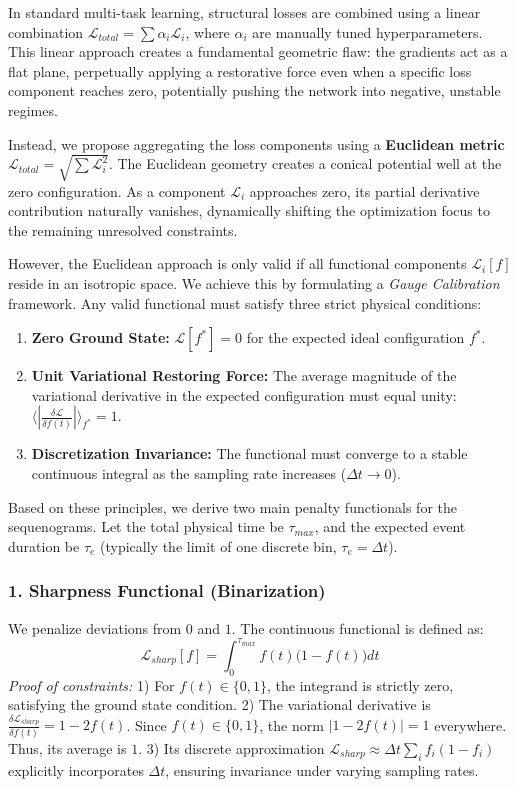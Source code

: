 \documentclass[11pt,a4paper]{article}
\begin{document}
In standard multi-task learning, structural losses are combined using a linear combination $\mathcal{L}_{total} = \sum \alpha_i \mathcal{L}_i$, where $\alpha_i$ are manually tuned hyperparameters. This linear approach creates a fundamental geometric flaw: the gradients act as a flat plane, perpetually applying a restorative force even when a specific loss component reaches zero, potentially pushing the network into negative, unstable regimes.

Instead, we propose aggregating the loss components using a \textbf{Euclidean metric} $\mathcal{L}_{total} = \sqrt{\sum \mathcal{L}_i^2}$. The Euclidean geometry creates a conical potential well at the zero configuration. As a component $\mathcal{L}_i$ approaches zero, its partial derivative contribution naturally vanishes, dynamically shifting the optimization focus to the remaining unresolved constraints.

However, the Euclidean approach is only valid if all functional components $\mathcal{L}_i[f]$ reside in an isotropic space. We achieve this by formulating a \textit{Gauge Calibration} framework. Any valid functional must satisfy three strict physical conditions:
\begin{enumerate}
    \item \textbf{Zero Ground State:} $\mathcal{L}[f^*] = 0$ for the expected ideal configuration $f^*$.
    \item \textbf{Unit Variational Restoring Force:} The average magnitude of the variational derivative in the expected configuration must equal unity: $\langle | \frac{\delta \mathcal{L}}{\delta f(t)} | \rangle_{f^*} = 1$.
    \item \textbf{Discretization Invariance:} The functional must converge to a stable continuous integral as the sampling rate increases ($\Delta t \to 0$).
\end{enumerate}

Based on these principles, we derive two main penalty functionals for the sequenograms. Let the total physical time be $\tau_{max}$, and the expected event duration be $\tau_e$ (typically the limit of one discrete bin, $\tau_e = \Delta t$).

\subsubsection*{1. Sharpness Functional (Binarization)}
We penalize deviations from $0$ and $1$. The continuous functional is defined as:
\begin{equation}
\mathcal{L}_{sharp}[f] = \int_{0}^{\tau_{max}} f(t)\big(1 - f(t)\big) dt
\end{equation}
\textit{Proof of constraints:}
1) For $f(t) \in \{0, 1\}$, the integrand is strictly zero, satisfying the ground state condition. 
2) The variational derivative is $\frac{\delta \mathcal{L}_{sharp}}{\delta f(t)} = 1 - 2f(t)$. Since $f(t) \in \{0,1\}$, the norm $|1-2f(t)| = 1$ everywhere. Thus, its average is $1$.
3) Its discrete approximation $\mathcal{L}_{sharp} \approx \Delta t \sum_i f_i(1-f_i)$ explicitly incorporates $\Delta t$, ensuring invariance under varying sampling rates.
\end{document}

